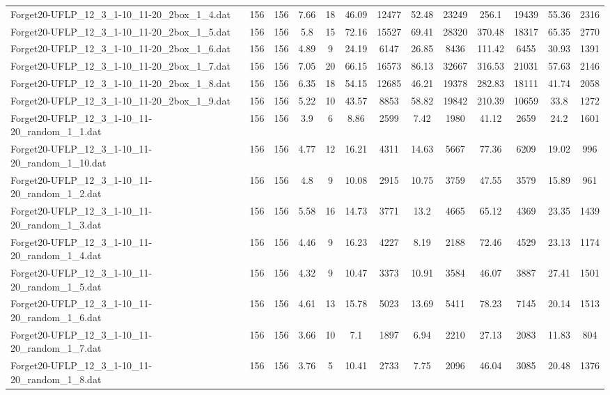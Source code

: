 \begin{table}[!ht]
{\begin{tabular}{lcccccccccccc}
Forget20-UFLP\_12\_3\_1-10\_11-20\_2box\_1\_4.dat & 156 & 156 & 7.66 & 18 & 46.09 & 12477 & 52.48 & 23249 & 256.1 & 19439 & 55.36 & 2316 \\
Forget20-UFLP\_12\_3\_1-10\_11-20\_2box\_1\_5.dat & 156 & 156 & 5.8 & 15 & 72.16 & 15527 & 69.41 & 28320 & 370.48 & 18317 & 65.35 & 2770 \\
Forget20-UFLP\_12\_3\_1-10\_11-20\_2box\_1\_6.dat & 156 & 156 & 4.89 & 9 & 24.19 & 6147 & 26.85 & 8436 & 111.42 & 6455 & 30.93 & 1391 \\
Forget20-UFLP\_12\_3\_1-10\_11-20\_2box\_1\_7.dat & 156 & 156 & 7.05 & 20 & 66.15 & 16573 & 86.13 & 32667 & 316.53 & 21031 & 57.63 & 2146 \\
Forget20-UFLP\_12\_3\_1-10\_11-20\_2box\_1\_8.dat & 156 & 156 & 6.35 & 18 & 54.15 & 12685 & 46.21 & 19378 & 282.83 & 18111 & 41.74 & 2058 \\
Forget20-UFLP\_12\_3\_1-10\_11-20\_2box\_1\_9.dat & 156 & 156 & 5.22 & 10 & 43.57 & 8853 & 58.82 & 19842 & 210.39 & 10659 & 33.8 & 1272 \\
Forget20-UFLP\_12\_3\_1-10\_11-20\_random\_1\_1.dat & 156 & 156 & 3.9 & 6 & 8.86 & 2599 & 7.42 & 1980 & 41.12 & 2659 & 24.2 & 1601 \\
Forget20-UFLP\_12\_3\_1-10\_11-20\_random\_1\_10.dat & 156 & 156 & 4.77 & 12 & 16.21 & 4311 & 14.63 & 5667 & 77.36 & 6209 & 19.02 & 996 \\
Forget20-UFLP\_12\_3\_1-10\_11-20\_random\_1\_2.dat & 156 & 156 & 4.8 & 9 & 10.08 & 2915 & 10.75 & 3759 & 47.55 & 3579 & 15.89 & 961 \\
Forget20-UFLP\_12\_3\_1-10\_11-20\_random\_1\_3.dat & 156 & 156 & 5.58 & 16 & 14.73 & 3771 & 13.2 & 4665 & 65.12 & 4369 & 23.35 & 1439 \\
Forget20-UFLP\_12\_3\_1-10\_11-20\_random\_1\_4.dat & 156 & 156 & 4.46 & 9 & 16.23 & 4227 & 8.19 & 2188 & 72.46 & 4529 & 23.13 & 1174 \\
Forget20-UFLP\_12\_3\_1-10\_11-20\_random\_1\_5.dat & 156 & 156 & 4.32 & 9 & 10.47 & 3373 & 10.91 & 3584 & 46.07 & 3887 & 27.41 & 1501 \\
Forget20-UFLP\_12\_3\_1-10\_11-20\_random\_1\_6.dat & 156 & 156 & 4.61 & 13 & 15.78 & 5023 & 13.69 & 5411 & 78.23 & 7145 & 20.14 & 1513 \\
Forget20-UFLP\_12\_3\_1-10\_11-20\_random\_1\_7.dat & 156 & 156 & 3.66 & 10 & 7.1 & 1897 & 6.94 & 2210 & 27.13 & 2083 & 11.83 & 804 \\
Forget20-UFLP\_12\_3\_1-10\_11-20\_random\_1\_8.dat & 156 & 156 & 3.76 & 5 & 10.41 & 2733 & 7.75 & 2096 & 46.04 & 3085 & 20.48 & 1376 \\

\end{tabular}}
\end{table}
